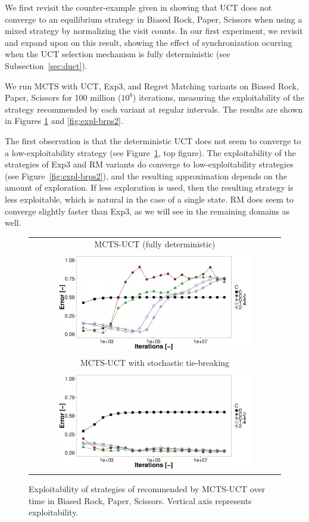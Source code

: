We first revisit the counter-example given in \cite{Shafiei09} showing that 
UCT does not converge to an equilibrium strategy in Biased Rock, Paper, Scissors 
when using a mixed strategy by normalizing the visit counts.
In our first experiment, we revisit and expand upon on this result, showing the effect of synchronization ocurring when the UCT selection mechanism is fully deterministic (see Subsection~\ref{sec:duct}).

We run MCTS with UCT, Exp3, and Regret Matching variants on Biased Rock, Paper, Scissors
for 100 million ($10^8$) iterations, measuring the exploitability of the strategy recommended by 
each variant at regular intervals. The results are shown in Figures \ref{fig:expl-brps1} and \ref{fig:expl-brps2}.

The first observation is that the deterministic UCT does not seem to converge to a low-exploitability strategy (see Figure~\ref{fig:expl-brps1}, top figure). The exploitability of the strategies of 
Exp3 and RM variants do converge to low-exploitability strategies (see Figure~\ref{fig:expl-brps2}), and the resulting approximation depends on the amount of exploration. 
If less exploration is used, then the resulting strategy is less exploitable, which is natural in the case of a single state. RM does seem to 
converge slightly faster than Exp3, as we will see in the remaining domains as well. 

\begin{figure}[t!]
\centering
\begin{tabular}{c}
{\small MCTS-UCT (fully deterministic)} \\
\includegraphics[width=0.8\textwidth]{figures/brps-MCTS-UCT.pdf} \\
{\small MCTS-UCT with stochastic tie-breaking} \\ 
\includegraphics[width=0.8\textwidth]{figures/brps-MCTS-UCT-NONDET.pdf} \\
\end{tabular}
\caption{Exploitability of strategies of recommended by MCTS-UCT over time in Biased Rock, Paper, Scissors. Vertical axis represents exploitability. }
\label{fig:expl-brps1}
\end{figure}

